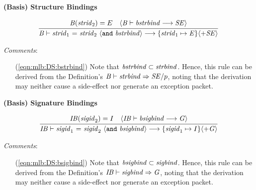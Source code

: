 \vspace{2\parsep}
{\large\noindent
\textbf{(Basis) Structure Bindings} \hfill 
{}
}\nopagebreak

\begin{equation}
\label{eqn:mlb:DS:bstrbind}
\judge{
\mit{B}(\mit{strid}_2) = E \quad
\langle\mit{B} \vdash \mit{bstrbind} \longrightarrow \mit{SE}\rangle
}{
\mit{B} \vdash \mit{strid}_1 ~\mtt{=}~ \mit{strid}_2 ~\langle\mtt{and}~\mit{bstrbind}\rangle \longrightarrow 
\{\mit{strid}_1 \mapsto \mit{E}\} \langle+ \mit{SE}\rangle
}
\end{equation}

\begin{samepage}
\noindent
\textit{Comments}:
\begin{itemize}
\item[(\ref{eqn:mlb:DS:bstrbind})] Note that $\mit{bstrbind} \subset
\mit{strbind}$.  Hence, this rule can be derived from the
Definition's $\mit{B} \vdash \mit{strbind} \Rightarrow \mit{SE} / p$, noting that
the derivation may neither cause a side-effect nor generate an
exception packet.
\end{itemize}
\end{samepage}

\vspace{2\parsep}
{\large\noindent
\textbf{(Basis) Signature Bindings} \hfill 
{}
}\nopagebreak

\begin{equation}
\label{eqn:mlb:DS:bsigbind}
\judge{
\mit{IB}(\mit{sigid}_2) = I \quad 
\langle\mit{IB} \vdash \mit{bsigbind} \longrightarrow \mit{G}\rangle
}{
\mit{IB} \vdash \mit{sigid}_1 ~\mtt{=}~ \mit{sigid}_2 ~\langle\mtt{and}~\mit{bsigbind}\rangle \longrightarrow 
\{\mit{sigid}_1 \mapsto I\} \langle+ \mit{G}\rangle
}
\end{equation}

\begin{samepage}
\noindent
\textit{Comments}:
\begin{itemize}
\item[(\ref{eqn:mlb:DS:bsigbind})] Note that $\mit{bsigbind} \subset
\mit{sigbind}$.  Hence, this rule can be derived from the
Definition's $\mit{IB} \vdash \mit{sigbind} \Rightarrow \mit{G}$, noting that
the derivation may neither cause a side-effect nor generate an
exception packet.
\end{itemize}
\end{samepage}

